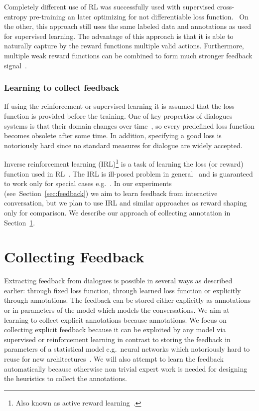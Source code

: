 \documentclass[11pt]{article}
\begin{document}
Completely different use of RL was successfully used with supervised cross-entropy pre-training an later optimizing for not differentiable loss function.~\cite{williams2016end}
On the other, this approach still uses the same labeled data and annotations as used for supervised learning.
The advantage of this approach is that it is able to naturally capture by the reward functions multiple valid actions.
Furthermore, multiple weak reward functions can be combined to form much stronger feedback signal~\cite{abbeel_apprenticeship_2004}.


\subsubsection*{Learning to collect feedback}\label{sub:irl}
If using the reinforcement or supervised learning it is assumed that the loss function is provided before the training.
One of key properties of dialogues systems is that their domain changes over time~\cite{yu_evolvable_2016}, so every predefined loss function becomes obsolete after some time.
In addition, specifying a good loss is notoriously hard since no standard measures for dialogue are widely accepted.

Inverse reinforcement learning (IRL)\footnote{Also known as active reward learning~\cite{su2016active}.} is a task of learning the loss (or reward) function used in RL~\cite{abbeel_apprenticeship_2004}.
The IRL is ill-posed problem in general~\cite{choi_inverse_2011} and is guaranteed to work only for special cases e.g.~\cite{abbeel_apprenticeship_2004}.  
In our experiments (see~Section~\ref{sec:feedback}) we aim to learn feedback from interactive conversation, but we plan to use IRL and similar approaches as reward shaping~\cite{su2016active} only for comparison.
We describe our approach of collecting annotation in Section~\ref{sec:learn_feedback}.

\section{Collecting Feedback}
\label{sec:learn_feedback}
Extracting feedback from dialogues is possible in several ways as described earlier: through fixed loss function, through learned loss function or explicitly through annotations.
The feedback can be stored either explicitly as annotations or in parameters of the model which models the conversations.
We aim at learning to collect explicit annotations because annotations.
We focus on collecting explicit feedback because it can be exploited by any model via supervised or reinforcement learning in contrast to storing the feedback in parameters of a statistical model e.g.\ neural networks which notoriously hard to reuse for new architectures~\cite{parameterNNtransfer}.
We will also attempt to learn the feedback automatically because otherwise non trivial expert work is needed for designing the heuristics to collect the annotations.
\end{document}
